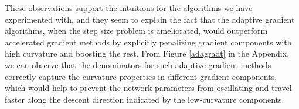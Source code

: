 These observations support the intuitions for the algorithms we have
experimented with, and they seem to explain the fact that the adaptive gradient
algorithms, when the step size problem is ameliorated, would outperform
accelerated gradient methods by explicitly penalizing gradient components with
high curvature and boosting the rest. From Figure \ref{adagradt} in the
Appendix, we can observe that the denominators for such adaptive gradient
methods correctly capture the curvature properties in different gradient
components, which would help to prevent the network parameters from oscillating
and travel faster along the descent direction indicated by the low-curvature
components.
